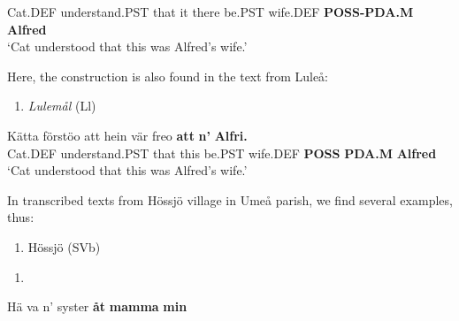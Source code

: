 Cat.DEF  understand.PST  that  it  there  be.PST  wife.DEF  \textbf{POSS-PDA.M} \textbf{Alfred}\\ %


‘Cat understood that this was Alfred’s wife.’
\z


Here, the construction is also found in the text from Luleå:


\begin{enumerate} %
\item 
\textit{Lulemål} (Ll)
\end{enumerate} %
\ea\label{}
\gll Kätta  förstöo  att  hein  vär  freo  \textbf{att}\textbf{  n’}\textbf{  Alfri.}\\


Cat.DEF  understand.PST  that  this  be.PST  wife.DEF  \textbf{POSS} \textbf{PDA.M} \textbf{Alfred}\\ %


‘Cat understood that this was Alfred’s wife.’
\z


In transcribed texts from Hössjö village in Umeå parish, we find several examples, thus:

\begin{enumerate} %
\item 
Hössjö (SVb)

\end{enumerate} %
\setcounter{listLFOxcviiileveli}{0}
\begin{enumerate} %
\item 
\end{enumerate} %
\ea\label{}
\gll Hä  va  n’  syster  \textbf{åt}\textbf{  mamma}\textbf{  min}\\


